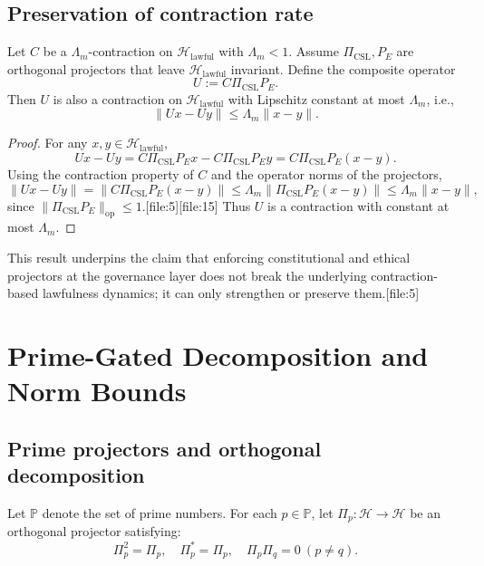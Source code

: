 \documentclass[11pt]{article}
\begin{document}
\subsection{Preservation of contraction rate}

\begin{proposition}
Let \(C\) be a \(\Lambda_m\)-contraction on \(\mathcal{H}_{\mathrm{lawful}}\) with \(\Lambda_m<1\).  
Assume \(\Pi_{\mathrm{CSL}}, P_E\) are orthogonal projectors that leave \(\mathcal{H}_{\mathrm{lawful}}\) invariant.  
Define the composite operator
\[
U := C\Pi_{\mathrm{CSL}} P_E.
\]
Then \(U\) is also a contraction on \(\mathcal{H}_{\mathrm{lawful}}\) with Lipschitz constant at most \(\Lambda_m\), i.e.,
\[
\|Ux - Uy\| \le \Lambda_m \|x-y\|.
\]
\end{proposition}

\begin{proof}
For any \(x,y\in\mathcal{H}_{\mathrm{lawful}}\),
\[
Ux - Uy = C\Pi_{\mathrm{CSL}} P_E x - C\Pi_{\mathrm{CSL}} P_E y
= C \Pi_{\mathrm{CSL}} P_E (x-y).
\]
Using the contraction property of \(C\) and the operator norms of the projectors,
\[
\|Ux - Uy\| = \|C\Pi_{\mathrm{CSL}} P_E (x-y)\|
\le \Lambda_m \|\Pi_{\mathrm{CSL}} P_E (x-y)\|
\le \Lambda_m \|x-y\|,
\]
since \(\|\Pi_{\mathrm{CSL}} P_E\|_{\mathrm{op}} \le 1\).[file:5][file:15]  
Thus \(U\) is a contraction with constant at most \(\Lambda_m\).
\end{proof}

This result underpins the claim that enforcing constitutional and ethical projectors at the governance layer does not break the underlying contraction-based lawfulness dynamics; it can only strengthen or preserve them.[file:5]

\section{Prime-Gated Decomposition and Norm Bounds}

\subsection{Prime projectors and orthogonal decomposition}

Let \(\mathbb{P}\) denote the set of prime numbers.  
For each \(p\in\mathbb{P}\), let \(\Pi_p : \mathcal{H}\to\mathcal{H}\) be an orthogonal projector satisfying:
\[
\Pi_p^2 = \Pi_p,\quad \Pi_p^\ast = \Pi_p,\quad \Pi_p\Pi_q = 0 \ (p\ne q).
\]
\end{document}
